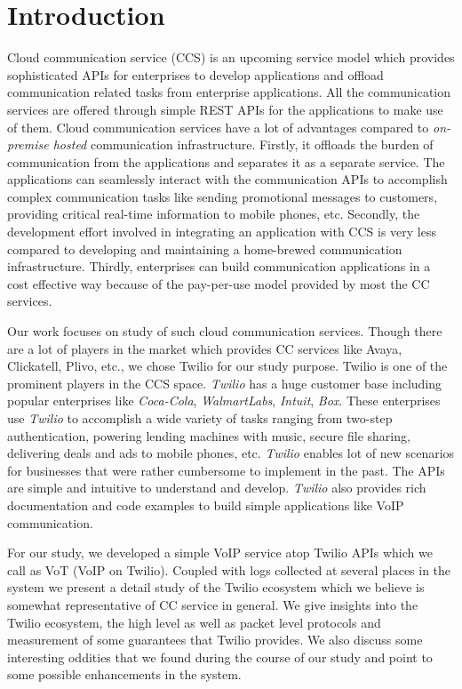 \section{Introduction}
\label{sec-intro}
Cloud communication service (CCS) is an upcoming service model which provides sophisticated APIs for enterprises to develop applications and offload communication related tasks from enterprise applications. 
All the communication services are offered through simple REST APIs for the applications to make use of them. Cloud communication services have a lot of advantages compared to \textit{on-premise hosted} communication infrastructure. Firstly, it offloads the burden of communication from the applications and separates it as a separate service. The applications can seamlessly interact with the communication APIs to accomplish complex communication tasks like sending promotional messages to customers, providing critical real-time information to mobile phones, etc. Secondly, the development effort involved in integrating an application with CCS is very less compared to developing and maintaining a home-brewed communication infrastructure.
Thirdly, enterprises can build communication applications in a cost effective way because of the pay-per-use model provided by most the CC services. 


Our work focuses on study of such cloud communication services. Though there are a lot of players in the market which provides CC services like Avaya, Clickatell, Plivo, etc., we chose Twilio for our study purpose. {Twilio} is one of the prominent players in the CCS space. \textit{Twilio} has a huge customer base  including popular enterprises like \textit{Coca-Cola}, \textit{WalmartLabs}, \textit{Intuit}, \textit{Box}. These enterprises use \textit{Twilio} to accomplish a wide variety of tasks ranging from two-step authentication, powering lending machines with music, secure file sharing, delivering deals and ads to mobile phones, etc. \textit{Twilio} enables lot of new scenarios for businesses that were rather cumbersome to implement in the past. 
The APIs are simple and intuitive to understand and develop. \textit{Twilio} also provides rich documentation and code examples to build simple applications like VoIP communication.

 For our study, we developed a simple VoIP service atop Twilio APIs which we call as VoT (VoIP on Twilio). Coupled with logs collected at several places in the system we present a detail study of the Twilio ecosystem which we believe is somewhat representative of CC service in general. We give insights into the Twilio ecosystem, the high level as well as packet level protocols and measurement of some guarantees that Twilio provides.  We also discuss some interesting oddities that we found during the course of our study and point to some possible enhancements in the system. 